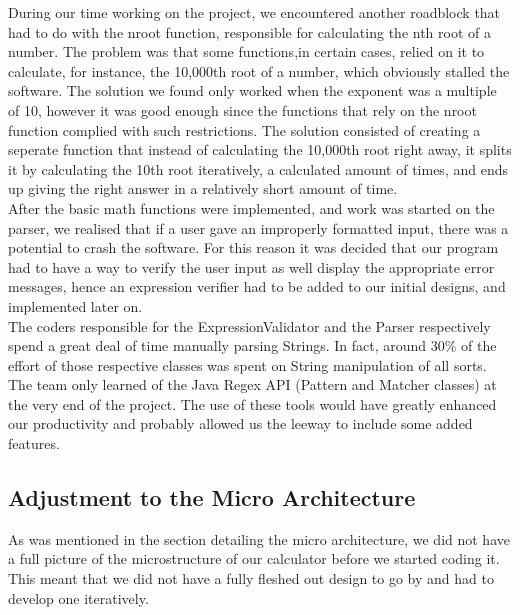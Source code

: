\documentclass[a4paper, 12pt]{article}
\begin{document}
During our time working on the project, we encountered another roadblock that had to do with the nroot function, responsible for calculating the nth root of a number. The problem was that some functions,in certain cases, relied on it to calculate, for instance, the 10,000th root of a number, which obviously stalled the software. The solution we found only worked when the exponent was a multiple of 10, however it was good enough since the functions that rely on the nroot function complied with such restrictions. The solution consisted of creating a seperate function that instead of calculating the 10,000th root right away, it splits it by calculating the 10th root iteratively, a calculated amount of times, and ends up giving the right answer in a relatively short amount of time. 
\\

After the basic math functions were implemented, and work was started on the parser, we realised that if a user gave an improperly formatted input, there was a potential to crash the software. For this reason it was decided that our program had to have a way to verify the user input as well display the appropriate error messages, hence an expression verifier had to be added to our initial designs, and implemented later on.
\\

The coders responsible for the ExpressionValidator and the Parser respectively spend a great deal of time manually parsing Strings. In fact, around 30\% of the effort of those respective classes was spent on String manipulation of all sorts. The team only learned of the Java Regex API (Pattern and Matcher classes) at the very end of the project. The use of these tools would have greatly enhanced our productivity and probably allowed us the leeway to include some added features.

\subsection{Adjustment to the Micro Architecture}

As was mentioned in the section detailing the micro architecture, we did not have a full picture of the microstructure of our calculator before we started coding it. This meant that we did not have a fully fleshed out design to go by and had to develop one iteratively. 
\\
\end{document}
